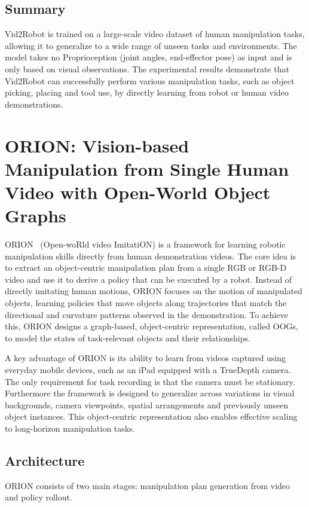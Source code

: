 \subsection{Summary}
Vid2Robot is trained on a large-scale video dataset of human manipulation tasks, allowing it to generalize to a wide range of unseen tasks and environments. The model takes no Proprioception (joint angles, end-effector pose) as input and is only based on visual observations.
The experimental results demonstrate that Vid2Robot can successfully perform various manipulation tasks, such as object picking, placing and tool use, by directly learning from robot or human video demonstrations. 




\section{ORION: Vision-based Manipulation from Single Human Video with Open-World Object Graphs}
ORION~\cite{Zhu2024VisionbasedMF} (Open-woRld video ImitatiON) is a framework for learning robotic manipulation skills directly from human demonstration videos. The core idea is to extract an object-centric manipulation plan from a single RGB or RGB-D video and use it to derive a policy that can be executed by a robot. Instead of directly imitating human motions, ORION focuses on the motion of manipulated objects, learning policies that move objects along trajectories that match the directional and curvature patterns observed in the demonstration.  To achieve this, ORION designs a graph-based, object-centric representation, called \acfp{OOG}, to model the states of task-relevant objects and their relationships.

A key advantage of ORION is its ability to learn from videos captured using everyday mobile devices, such as an iPad equipped with a TrueDepth camera. The only requirement for task recording is that the camera must be stationary. Furthermore the framework is designed to generalize across variations in visual backgrounds, camera viewpoints, spatial arrangements and previously unseen object instances. This object-centric representation also enables effective scaling to long-horizon manipulation tasks.


\subsection{Architecture}
ORION consists of two main stages: manipulation plan generation from video and policy rollout. 


